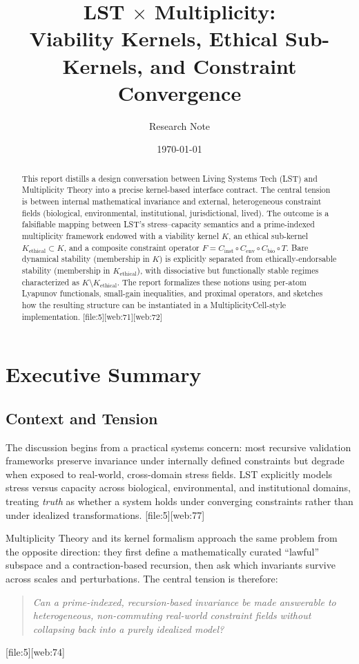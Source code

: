 \documentclass[11pt]{article}
\title{LST $\times$ Multiplicity:\\
Viability Kernels, Ethical Sub-Kernels, and Constraint Convergence}
\author{Research Note}
\date{\today}
\begin{document}
\maketitle

\begin{abstract}
This report distills a design conversation between Living Systems Tech (LST) and Multiplicity Theory into a precise kernel-based interface contract. The central tension is between internal mathematical invariance and external, heterogeneous constraint fields (biological, environmental, institutional, jurisdictional, lived). The outcome is a falsifiable mapping between LST's stress--capacity semantics and a prime-indexed multiplicity framework endowed with a viability kernel \(K\), an ethical sub-kernel \(K_{\text{ethical}}\subset K\), and a composite constraint operator \(F = C_{\text{inst}}\circ C_{\text{env}}\circ C_{\text{bio}}\circ T\). Bare dynamical stability (membership in \(K\)) is explicitly separated from ethically-endorsable stability (membership in \(K_{\text{ethical}}\)), with dissociative but functionally stable regimes characterized as \(K\setminus K_{\text{ethical}}\). The report formalizes these notions using per-atom Lyapunov functionals, small-gain inequalities, and proximal operators, and sketches how the resulting structure can be instantiated in a MultiplicityCell-style implementation. [file:5][web:71][web:72]
\end{abstract}
\newpage
\tableofcontents
\newpage
\section{Executive Summary}

\subsection{Context and Tension}

The discussion begins from a practical systems concern: most recursive validation frameworks preserve invariance under internally defined constraints but degrade when exposed to real-world, cross-domain stress fields. LST explicitly models stress versus capacity across biological, environmental, and institutional domains, treating \emph{truth} as whether a system holds under converging constraints rather than under idealized transformations. [file:5][web:77]

Multiplicity Theory and its kernel formalism approach the same problem from the opposite direction: they first define a mathematically curated ``lawful'' subspace and a contraction-based recursion, then ask which invariants survive across scales and perturbations. The central tension is therefore:
\begin{quote}
\emph{Can a prime-indexed, recursion-based invariance be made answerable to heterogeneous, non-commuting real-world constraint fields without collapsing back into a purely idealized model?}
\end{quote}
[file:5][web:74]
\end{document}
